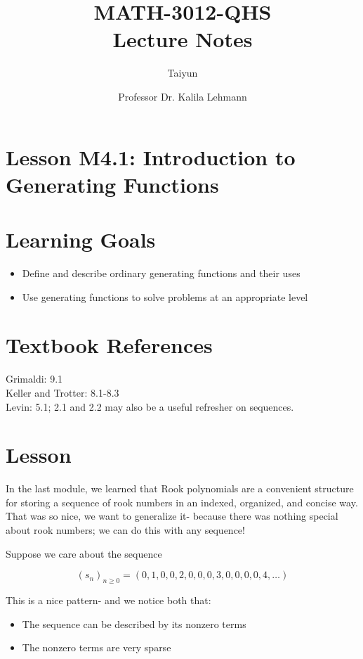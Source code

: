 \documentclass{article}
\author{Taiyun}
\title{MATH-3012-QHS \\ Lecture Notes}
\date{Professor Dr. Kalila Lehmann}
\begin{document}
\maketitle







\section*{Lesson M4.1: Introduction to Generating Functions}
\section*{Learning Goals}
\begin{itemize}
  \item Define and describe ordinary generating functions and their uses
  \item Use generating functions to solve problems at an appropriate level
\end{itemize}

\section*{Textbook References}
Grimaldi: 9.1\\
Keller and Trotter: 8.1-8.3\\
Levin: 5.1; 2.1 and 2.2 may also be a useful refresher on sequences.

\section*{Lesson}
In the last module, we learned that Rook polynomials are a convenient structure for storing a sequence of rook numbers in an indexed, organized, and concise way. That was so nice, we want to generalize it- because there was nothing special about rook numbers; we can do this with any sequence!

Suppose we care about the sequence

$$
\left(s_{n}\right)_{n \geq 0}=(0,1,0,0,2,0,0,0,3,0,0,0,0,4, \ldots)
$$

This is a nice pattern- and we notice both that:

\begin{itemize}
  \item The sequence can be described by its nonzero terms
  \item The nonzero terms are very sparse
\end{itemize}
\end{document}
